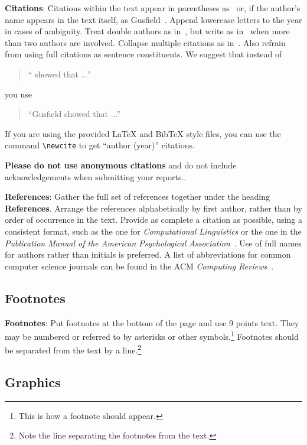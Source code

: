 \documentclass[11pt]{article}
\begin{document}
{\bf Citations}: Citations within the text appear in parentheses
as~\cite{Gusfield:97} or, if the author's name appears in the text
itself, as Gusfield~.  Append lowercase letters
to the year in cases of ambiguity.  Treat double authors as
in~\cite{Aho:72}, but write as in~\cite{Chandra:81} when more than two
authors are involved. Collapse multiple citations as
in~\cite{Gusfield:97,Aho:72}. Also refrain from using full citations
as sentence constituents. We suggest that instead of
\begin{quote}
  ``\cite{Gusfield:97} showed that ...''
\end{quote}
you use
\begin{quote}
``Gusfield    showed that ...''
\end{quote}

If you are using the provided \LaTeX{} and Bib\TeX{} style files, you
can use the command \verb|\newcite| to get ``author (year)'' citations.

\textbf{Please do not use anonymous citations} and do not include
acknowledgements when submitting your reports..

\textbf{References}: Gather the full set of references together under
the heading {\bf References}. Arrange the references alphabetically
by first author, rather than by order of occurrence in the text.
Provide as complete a citation as possible, using a consistent format,
such as the one for {\em Computational Linguistics\/} or the one in the 
{\em Publication Manual of the American 
Psychological Association\/}~\cite{APA:83}.  Use of full names for
authors rather than initials is preferred.  A list of abbreviations
for common computer science journals can be found in the ACM 
{\em Computing Reviews\/}~\cite{ACM:83}.

\subsection{Footnotes}

{\bf Footnotes}: Put footnotes at the bottom of the page and use 9
points text. They may be numbered or referred to by asterisks or other
symbols.\footnote{This is how a footnote should appear.} Footnotes
should be separated from the text by a line.\footnote{Note the line
separating the footnotes from the text.}

\subsection{Graphics}
\end{document}
